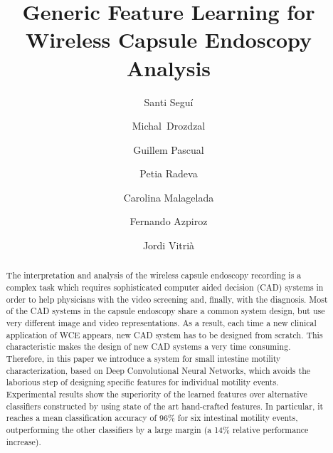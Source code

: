 \documentclass[review,12pt,3p]{elsarticle}
\begin{document}
\title{Generic Feature Learning for Wireless Capsule Endoscopy Analysis}

\author[label1,label2]{Santi Segu\'i}
\address[label1]{Dept. Matem\`atica Aplicada i An\`alisi, Universitat de Barcelona, Barcelona}
\address[label2]{Computer Vision Center (CVC), Barcelona, Spain}


\author[label5]{Michal~Drozdzal}
\address[label5]{Medtronic GI, Yoqneam, Israel}

\author[label1]{Guillem Pascual}
\author[label1,label2]{Petia Radeva}
\author[label3]{Carolina Malagelada}
\address[label3]{Digestive System Research Unit, Hospital Vall d'Hebron, Barcelona, Spain}
\author[label3]{Fernando Azpiroz}
\author[label1,label2]{Jordi Vitri\`a}




\maketitle

\begin{abstract}
The interpretation and analysis of the wireless capsule endoscopy recording is a complex task which requires sophisticated computer aided decision (CAD) systems in order to help physicians with the video screening and, finally, with the diagnosis. Most of the CAD systems in the capsule endoscopy share a common system design, but use very different image and video representations. As a result, each time a new clinical application of WCE appears, new CAD system has to be designed from scratch. This characteristic makes the design of new CAD systems a very time consuming. Therefore, in this paper we introduce a system for small intestine motility characterization, based on Deep Convolutional Neural Networks, which avoids the laborious step of designing specific features for individual motility events. Experimental results show the superiority of the learned features over alternative classifiers constructed by using state of the art hand-crafted features. In particular, it reaches a mean classification accuracy of 96\% for six intestinal motility events, outperforming the other classifiers by a large margin (a 14\% relative performance increase).

\end{abstract}

\end{document}
